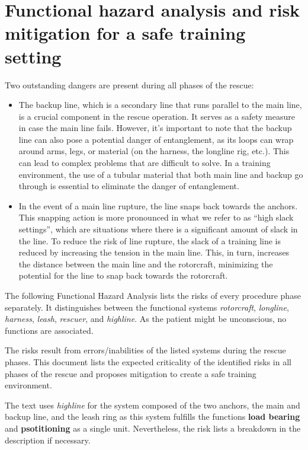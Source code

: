 \documentclass[a4paper,10pt]{scrartcl}
\begin{document}
\section{Functional hazard analysis and risk mitigation for a safe training setting}
\label{sec:fha}

Two outstanding dangers are present during all phases of the rescue:
\begin{itemize}
\item The backup line, which is a secondary line that runs parallel to the main line, is a crucial component in the rescue operation. It serves as a safety measure in case the main line fails. However, it's important to note that the backup line can also pose a potential danger of entanglement, as its loops can wrap around arms, legs, or material (on the harness, the longline rig, etc.). This can lead to complex problems that are difficult to solve. In a training environment, the use of a tubular material that both main line and backup go through is essential to eliminate the danger of entanglement.
\item In the event of a main line rupture, the line snaps back towards the anchors. This snapping action is more pronounced in what we refer to as ``high slack settings'', which are situations where there is a significant amount of slack in the line. To reduce the risk of line rupture, the slack of a training line is reduced by increasing the tension in the main line. This, in turn, increases the distance between the main line and the rotorcraft, minimizing the potential for the line to snap back towards the rotorcraft.
\end{itemize} 

The following Functional Hazard Analysis lists the risks of every procedure phase separately. It distinguishes between the functional systems \textit{rotorcraft}, \textit{longline}, \textit{harness}, \textit{leash}, \textit{rescuer}, and \textit{highline}. As the patient might be unconscious,   no functions are associated. 


The risks result from errors/inabilities of the listed systems during the rescue phases. This document lists the expected criticality of the identified risks in all phases of the rescue and proposes mitigation to create a safe training environment. 


The text uses \textit{highline} for the system composed of the two anchors, the main and backup line, and the leash ring as this system fulfills the functions \textbf{load bearing} and \textbf{psotitioning} as a single unit. Nevertheless, the risk lists a breakdown in the description if necessary. 
\end{document}
